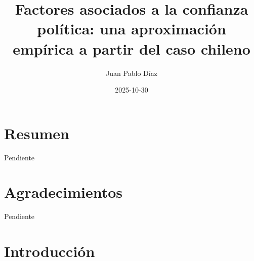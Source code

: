 \documentclass[12pt,twoside]{templates/facsothesis}
\title{Factores asociados a la confianza política: una aproximación empírica a partir del caso chileno}
\author{Juan Pablo Díaz}
\date{2025-10-30}
\begin{document}

  \maketitle

\frontmatter %
\pagestyle{empty} %



  \setcounter{tocdepth}{1}
  \setlength{\parskip}{0pt}
  \tableofcontents

\setlength\parskip{1em plus 0.1em minus 0.2em}

  \listoftables

  \listoffigures



\mainmatter %
\pagestyle{fancyplain} %

\chapter*{Resumen}\label{resumen}

Pendiente

\chapter*{Agradecimientos}\label{agradecimientos}

Pendiente

\chapter{Introducción}\label{introducciuxf3n}
\end{document}
